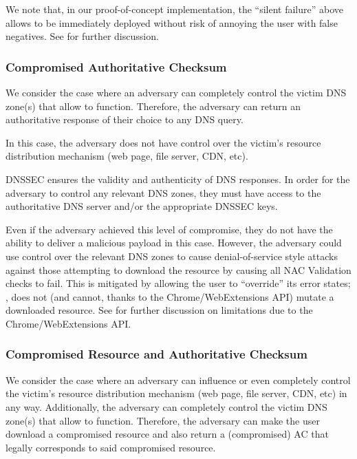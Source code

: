 We note that, in our proof-of-concept implementation, the ``silent failure''
above allows \SYSTEM{} to be immediately deployed without risk of annoying the
user with false negatives. See  for further discussion.

\subsubsection{Compromised Authoritative Checksum}

We consider the case where an adversary can completely control the victim DNS
zone(s) that allow \SYSTEM{} to function. Therefore, the adversary can return an
authoritative response of their choice to any DNS query.

In this case, the adversary does not have control over the victim's resource
distribution mechanism (web page, file server, CDN, etc).

DNSSEC ensures the validity and authenticity of DNS responses. In order for the
adversary to control any relevant DNS zones, they must have access to the
authoritative DNS server and/or the appropriate DNSSEC keys.

Even if the adversary achieved this level of compromise, they do not have the
ability to deliver a malicious payload in this case. However, the adversary
could use control over the relevant DNS zones to cause denial-of-service style
attacks against those attempting to download the resource by causing all NAC
Validation checks to fail. This is mitigated by \SYSTEM{} allowing the user to
``override'' its error states; \ie, \SYSTEM{} does not (and cannot, thanks to
the Chrome/WebExtensions API) mutate a downloaded resource. See
 for further discussion on limitations due to the
Chrome/WebExtensions API.

\subsubsection{Compromised Resource and Authoritative Checksum}

We consider the case where an adversary can influence or even completely control
the victim's resource distribution mechanism (web page, file server, CDN, etc)
in any way. Additionally, the adversary can completely control the victim DNS
zone(s) that allow \SYSTEM{} to function. Therefore, the adversary can make the
user download a compromised resource and also return a (compromised) AC that
legally corresponds to said compromised resource.

